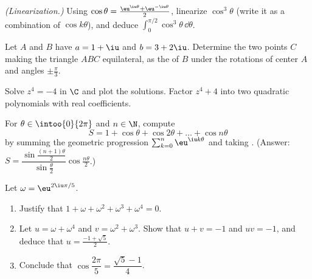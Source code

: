 \begin{exercise}[$\star\star$]\label{exo:g12:complex:6}
\emph{(Linearization.)} Using
$\cos\theta = \frac{\eu^{\iu\theta} + \eu^{-\iu\theta}}{2}$, linearize
$\cos^3\theta$ (write it as a combination of $\cos k\theta$), and deduce
$\displaystyle\int_0^{\pi/2}\cos^3\theta\,\dd\theta$.
\end{exercise}

\begin{exercise}[$\star\star$]\label{exo:g12:complex:7}
Let $A$ and $B$ have  $a = 1 + \iu$ and $b = 3 + 2\iu$. Determine the
two points $C$ making the triangle $ABC$ equilateral, as the  of $B$
under the rotations of center $A$ and angles $\pm\frac{\pi}{3}$.
\end{exercise}

\begin{exercise}[$\star\star\star$]\label{exo:g12:complex:8}
Solve $z^4 = -4$ in $\C$ and plot the solutions. Factor
$z^4 + 4$ into two quadratic polynomials with real coefficients.
\end{exercise}

\begin{exercise}[$\star\star\star$]\label{exo:g12:complex:9}
For $\theta \in \intoo{0}{2\pi}$ and $n \in \N$, compute
\[
S = 1 + \cos\theta + \cos 2\theta + \dots + \cos n\theta
\]
by summing the geometric progression
$\sum_{k=0}^n \eu^{\iu k\theta}$ and taking . (Answer:
$S = \dfrac{\sin\frac{(n+1)\theta}{2}}{\sin\frac{\theta}{2}}
\cos\frac{n\theta}{2}$.)
\end{exercise}

\begin{exercise}[$\star\star\star$]\label{exo:g12:complex:10}
Let $\omega = \eu^{2\iu\pi/5}$.
\begin{enumerate}
  \item Justify that $1 + \omega + \omega^2 + \omega^3 + \omega^4 = 0$.
  \item Let $u = \omega + \omega^4$ and $v = \omega^2 + \omega^3$. Show that
        $u + v = -1$ and $uv = -1$, and deduce that $u = \frac{-1+\sqrt5}{2}$.
  \item Conclude that $\cos\dfrac{2\pi}{5} = \dfrac{\sqrt5 - 1}{4}$.
\end{enumerate}
\end{exercise}
